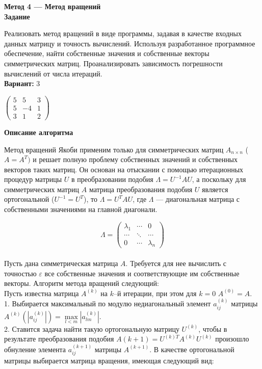 \textbf{Метод 4 --- Метод вращений}\\

\textbf{Задание}

Реализовать метод вращений в виде программы, задавая в качестве входных данных матрицу и точность вычислений. Используя разработанное программное обеспечение, найти собственные значения и собственные векторы симметрических матриц. Проанализировать зависимость погрешности вычислений от числа итераций.\\

\textbf{Вариант:} 3

$
\begin{pmatrix}
5 & 5 & 3\\
5 & -4 & 1\\
3 & 1 & 2
\end{pmatrix}
$
\vspace{0.5cm}

\textbf{Описание алгоритма}

Метод вращений Якоби применим только для симметрических матриц $A_{n \times n}$ ($A=A^T)$ и решает полную проблему собственных значений и собственных векторов таких матриц. Он основан на отыскании с помощью итерационных процедур матрицы $U$ в преобразовании подобия $\Lambda = U^{-1}AU$, а поскольку для симметрических матриц $A$ матрица преобразования подобия $U$ является ортогональной ($U^{-1}=U^T$), то $\Lambda = U^TAU$, где $\Lambda$ --- диагональная матрица с собственными значениями на главной диагонали.

$$
\Lambda = \begin{pmatrix}
\lambda_1 & \cdots & 0\\
\cdots & \ddots & \cdots\\
0 & \cdots & \lambda_n
\end{pmatrix}
$$\\

Пусть дана симметрическая матрица $A$. Требуется для нее вычислить с точностью $\varepsilon$ все собственные значения и соответствующие им собственные векторы. Алгоритм метода вращений следующий:\\

Пусть известна матрица $A^{(k)}$ на $k$--й итерации, при этом для $k=0$ $A^{(0)}=A$.\\
1. Выбирается максимальный по модулю недиагональный элемент $a_{ij}^{(k)}$ матрицы $A^{(k)} (|a_{ij}^{(k)}|)=\max\limits_{l<m}|a_{lm}^{(k)}|$.\\
2. Ставится задача найти такую ортогональную матрицу $U^{(k)}$, чтобы в результате преобразования подобия $A{(k+1)}=U^{(k)T}A^{(k)}U^{(k)}$ произошло обнуление элемента $a_{ij}^{(k+1)}$ матрицы $A^{(k+1)}$. В качестве ортогональной матрицы выбирается матрица вращения, имеющая следующий вид:

